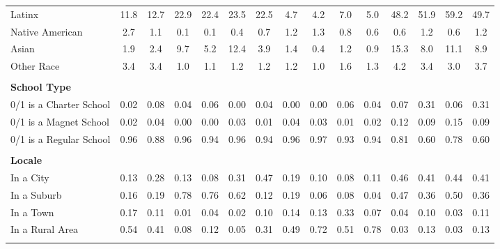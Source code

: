 \begin{tabular*}{\linewidth}{@{\extracolsep{\fill} } lcccccccccccccc}
\hspace{0.2cm}Latinx&11.8&12.7&22.9&22.4&23.5&22.5&4.7&4.2&7.0&5.0&48.2&51.9&59.2&49.7\\%
\hspace{0.2cm}Native American&2.7&1.1&0.1&0.1&0.4&0.7&1.2&1.3&0.8&0.6&0.6&1.2&0.6&1.2\\%
\hspace{0.2cm}Asian&1.9&2.4&9.7&5.2&12.4&3.9&1.4&0.4&1.2&0.9&15.3&8.0&11.1&8.9\\%
\hspace{0.2cm}Other Race&3.4&3.4&1.0&1.1&1.2&1.2&1.2&1.0&1.6&1.3&4.2&3.4&3.0&3.7\\%
&&&&&&&&&&&&&&\\%
\multicolumn{15}{l}{\bfseries School Type}\\%
\hspace{0.2cm}0/1 is a Charter School&0.02&0.08&0.04&0.06&0.00&0.04&0.00&0.00&0.06&0.04&0.07&0.31&0.06&0.31\\%
\hspace{0.2cm}0/1 is a Magnet School&0.02&0.04&0.00&0.00&0.03&0.01&0.04&0.03&0.01&0.02&0.12&0.09&0.15&0.09\\%
\hspace{0.2cm}0/1 is a Regular School&0.96&0.88&0.96&0.94&0.96&0.94&0.96&0.97&0.93&0.94&0.81&0.60&0.78&0.60\\%
&&&&&&&&&&&&&&\\%
\multicolumn{15}{l}{\bfseries Locale}\\%
\hspace{0.2cm}In a City&0.13&0.28&0.13&0.08&0.31&0.47&0.19&0.10&0.08&0.11&0.46&0.41&0.44&0.41\\%
\hspace{0.2cm}In a Suburb&0.16&0.19&0.78&0.76&0.62&0.12&0.19&0.06&0.08&0.04&0.47&0.36&0.50&0.36\\%
\hspace{0.2cm}In a Town&0.17&0.11&0.01&0.04&0.02&0.10&0.14&0.13&0.33&0.07&0.04&0.10&0.03&0.11\\%
\hspace{0.2cm}In a Rural Area&0.54&0.41&0.08&0.12&0.05&0.31&0.49&0.72&0.51&0.78&0.03&0.13&0.03&0.13\\%
&&&&&&&&&&&&&&\\%
\hline%
\end{tabular*}